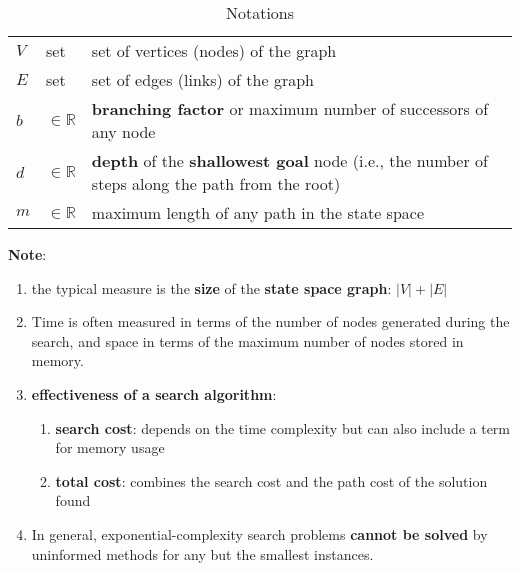 \vspace{0.5cm}

\begin{customArrayStretch}{1.3}
\begin{table}[H]
\centering
\begin{tabular}{l l p{12cm}}

$V$ & set & set of vertices (nodes) of the graph \\

$E$ & set & set of edges (links) of the graph \\

$b$ & $\in \mathbb{R}$ & \textbf{branching factor} or maximum number of successors of any node \\

$d$ & $\in \mathbb{R}$ & \textbf{depth} of the \textbf{shallowest goal} node (i.e., the number of steps along the path from the root) \\

$m$ & $\in \mathbb{R}$ & maximum length of any path in the state space \\

\end{tabular}
\caption*{Notations}
\end{table}
\end{customArrayStretch}


\textbf{Note}:
\begin{enumerate}[itemsep=0.2cm]
    \item the typical measure is the \textbf{size} of the \textbf{state space graph}: $|V| + |E|$ 
    \hfill \cite{ai/book/Artificial-Intelligence-A-Modern-Approach/Russell-Norvig}

    \item Time is often measured in terms of the number of nodes generated during the search, and space in terms of the maximum number of nodes stored in memory.
    \hfill \cite{ai/book/Artificial-Intelligence-A-Modern-Approach/Russell-Norvig}

    \item \textbf{effectiveness of a search algorithm}:
    \begin{enumerate}[itemsep=0.2cm]
        \item \textbf{search cost}: depends on the time complexity but can also include a term for memory usage
        \hfill \cite{ai/book/Artificial-Intelligence-A-Modern-Approach/Russell-Norvig}

        \item \textbf{total cost}: combines the search cost and the path cost of the solution found
        \hfill \cite{ai/book/Artificial-Intelligence-A-Modern-Approach/Russell-Norvig}
    \end{enumerate}

    \item In general, exponential-complexity search problems \textbf{cannot be solved} by uninformed methods for any but the smallest instances.
\end{enumerate}






